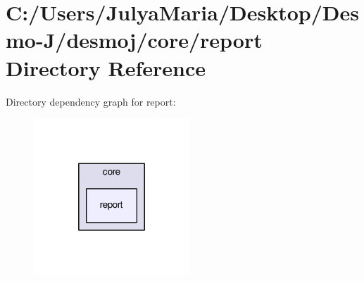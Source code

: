 \section{C\-:/\-Users/\-Julya\-Maria/\-Desktop/\-Desmo-\/\-J/desmoj/core/report Directory Reference}
\label{dir_ec50d968f8d488fb12242e33626f1ff0}
Directory dependency graph for report\-:
\nopagebreak
\begin{figure}[H]
\begin{center}
\leavevmode
\includegraphics[width=166pt]{dir_ec50d968f8d488fb12242e33626f1ff0_dep}
\end{center}
\end{figure}
